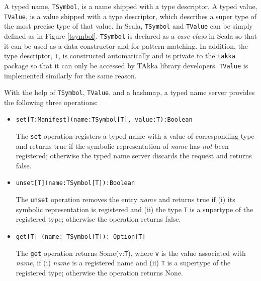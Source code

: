 A typed name, {\tt TSymbol}, is a name shipped with a type descriptor.  A 
typed value, {\tt TValue}, is a value shipped with a type descriptor, which
describes a super type of the most precise type of that value.  
In Scala, {\tt TSymbol} and {\tt TValue} can be simply defined as in Figure
\ref{tsymbol}.  {\tt TSymbol} is declared as a {\it case class} in Scala so 
that it can be used as a data constructor and for pattern matching.  In 
addition, the type descriptor, {\tt t}, is constructed automatically and is 
private to the {\tt takka} package so that it can only be accessed by TAkka 
library developers. {\tt TValue} is implemented similarly for the same reason.

With the help of {\tt TSymbol}, {\tt TValue}, and a hashmap, a typed name 
server provides the following three operations:




\begin{itemize}
  \item {\tt set[T:Manifest](name:TSymbol[T], value:T):Boolean}

The {\tt set} operation registers a typed name with a value of corresponding 
type and returns true if the symbolic representation of {\it name} has {\it 
not} been registered; otherwise the typed name server discards the request and
returns false.

  \item {\tt unset[T](name:TSymbol[T]):Boolean}

The {\tt unset} operation removes the entry {\it name} and returns true if (i) 
its symbolic representation is registered and (ii) the type {\tt T} is a 
supertype of the registered type; otherwise the operation returns false.

  \item {\tt get[T] (name: TSymbol[T]): Option[T]}

The {\tt get} operation returns Some(v:{\tt T}), where {\tt v} is the value 
associated with {\it name}, if (i) {\it name} is a registered name and (ii) 
{\tt T} is a supertype of the registered type; otherwise the operation returns 
None.

\end{itemize}

